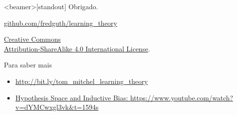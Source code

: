 \documentclass[10pt, professionalfonts]{beamer}
\begin{document}
\begin{frame}<beamer>[standout]
  Obrigado.
  \vspace*{.5cm}
\begin{center}\href{https://github.com/fredguth/learning_theory.git}{\url{github.com/fredguth/learning_theory}}\end{center}
  \vspace*{.5cm}
  \small{
    \begin{center}\ccbysa\end{center}
    \href{http://creativecommons.org/licenses/by-sa/4.0/}{Creative Commons \\
      Attribution-ShareAlike 4.0 International License}.
  }
\end{frame}

\appendix

\begin{frame}[fragile]{Para saber mais}
  \begin{itemize}
    \item \href{http://bit.ly/tom_mitchel_learning_theory}{\url{http://bit.ly/tom_mitchel_learning_theory}}
    \item \href{https://www.youtube.com/watch?v=dYMCwxgl3vk&t=1594s}{Hypothesis Space and Inductive Bias: \url{https://www.youtube.com/watch?v=dYMCwxgl3vk&t=1594s}}
  \end{itemize}
\end{frame}
\end{document}
